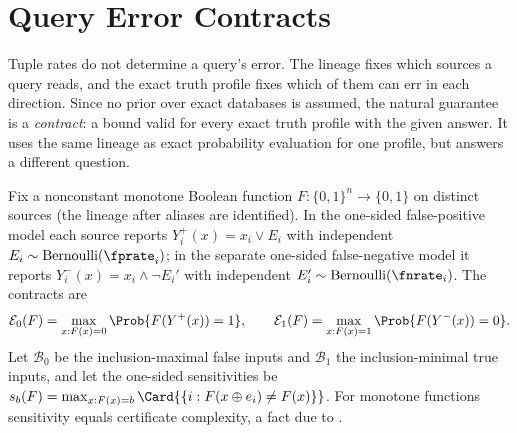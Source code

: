 %

\section{Query Error Contracts}
\label{sec:query-contracts}

Tuple rates do not determine a query's error. The lineage fixes which sources a
query reads, and the exact truth profile fixes which of them can err in each
direction. Since no prior over exact databases is assumed, the natural guarantee
is a \emph{contract}: a bound valid for every exact truth
profile with the given answer. It uses the same lineage as exact probability
evaluation for one profile, but answers a different question.

Fix a nonconstant monotone Boolean function $F : \{0, 1\}^n \to \{0, 1\}$ on
distinct sources (the lineage after aliases are identified). In the one-sided
false-positive model each source reports $Y_i^{+}(x) = x_i \lor E_i$ with
independent $E_i \sim \mathrm{Bernoulli}(\fprate_i)$; in the separate one-sided
false-negative model it reports $Y_i^{-}(x) = x_i \land \lnot E_i'$ with
independent $E_i' \sim \mathrm{Bernoulli}(\fnrate_i)$. The contracts are
\[
  \mathcal{E}_0(F) = \max_{x : F(x) = 0} \Prob{F(Y^{+}(x)) = 1},
  \qquad
  \mathcal{E}_1(F) = \max_{x : F(x) = 1} \Prob{F(Y^{-}(x)) = 0}.
\]
Let $\mathcal{B}_0$ be the inclusion-maximal false inputs and $\mathcal{B}_1$ the
inclusion-minimal true inputs, and let the one-sided
sensitivities be $s_b(F) = \max_{x : F(x) = b}
\Card{\{i : F(x \oplus e_i) \ne F(x)\}}$. For monotone functions sensitivity equals
certificate complexity, a fact due to \textcite{nisan-1991}.

